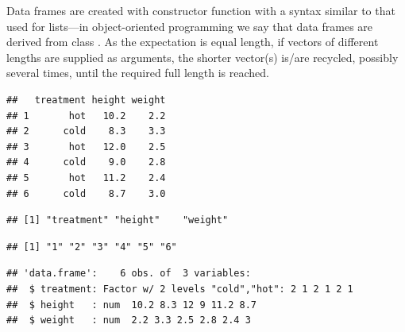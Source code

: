 \documentclass[krantz2]{krantz}\usepackage{knitr}
\begin{document}
Data frames are created with constructor function  with a syntax similar to that used for lists---in object-oriented programming we say that data frames are derived from class . As the expectation is equal length, if vectors of different lengths are supplied as arguments, the shorter vector(s) is/are recycled, possibly several times, until the required full length is reached.

\begin{knitrout}\footnotesize
{}\color{fgcolor}\begin{kframe}
\begin{alltt}
 \hlkwb{<-} \hlstd{(} \hlstd{=} \hlstd{(}\hlstd{(}\hlstd{(}\hlstd{,} \hlstd{),} \hlstd{)),}
                    \hlstd{=} \hlstd{(}\hlstd{,} \hlstd{,} \hlstd{,} \hlstd{,} \hlstd{,} \hlstd{),}
                    \hlstd{=} \hlstd{(}\hlstd{,} \hlstd{,} \hlstd{,} \hlstd{,} \hlstd{,} \hlstd{))}
\end{alltt}
\begin{verbatim}
##   treatment height weight
## 1       hot   10.2    2.2
## 2      cold    8.3    3.3
## 3       hot   12.0    2.5
## 4      cold    9.0    2.8
## 5       hot   11.2    2.4
## 6      cold    8.7    3.0
\end{verbatim}
\begin{alltt}
\end{alltt}
\begin{verbatim}
## [1] "treatment" "height"    "weight"
\end{verbatim}
\begin{alltt}
\end{alltt}
\begin{verbatim}
## [1] "1" "2" "3" "4" "5" "6"
\end{verbatim}
\begin{alltt}
\end{alltt}
\begin{verbatim}
## 'data.frame':	6 obs. of  3 variables:
##  $ treatment: Factor w/ 2 levels "cold","hot": 2 1 2 1 2 1
##  $ height   : num  10.2 8.3 12 9 11.2 8.7
##  $ weight   : num  2.2 3.3 2.5 2.8 2.4 3

\end{verbatim}
\end{kframe}
\end{knitrout}
\end{document}
